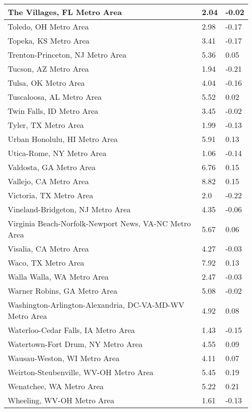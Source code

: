\documentclass[12pt,oneside, letterpaper]{book}
\begin{document}
\begin{longtable}{| p{} | p{} | p{} |}
    The Villages, FL Metro Area & 2.04 & -0.02 \\ \hline
    Toledo, OH Metro Area & 2.98 & -0.17 \\ \hline
    Topeka, KS Metro Area & 3.41 & -0.17 \\ \hline
    Trenton-Princeton, NJ Metro Area & 5.36 & 0.05 \\ \hline
    Tucson, AZ Metro Area & 1.94 & -0.21 \\ \hline
    Tulsa, OK Metro Area & 4.04 & -0.16 \\ \hline
    Tuscaloosa, AL Metro Area & 5.52 & 0.02 \\ \hline
    Twin Falls, ID Metro Area & 3.45 & -0.02 \\ \hline
    Tyler, TX Metro Area & 1.99 & -0.13 \\ \hline
    Urban Honolulu, HI Metro Area & 5.91 & 0.13 \\ \hline
    Utica-Rome, NY Metro Area & 1.06 & -0.14 \\ \hline
    Valdosta, GA Metro Area & 6.76 & 0.15 \\ \hline
    Vallejo, CA Metro Area & 8.82 & 0.15 \\ \hline
    Victoria, TX Metro Area & 2.0 & -0.22 \\ \hline
    Vineland-Bridgeton, NJ Metro Area & 4.35 & -0.06 \\ \hline
    Virginia Beach-Norfolk-Newport News, VA-NC Metro Area & 5.67 & 0.06 \\ \hline
    Visalia, CA Metro Area & 4.27 & -0.03 \\ \hline
    Waco, TX Metro Area & 7.92 & 0.13 \\ \hline
    Walla Walla, WA Metro Area & 2.47 & -0.03 \\ \hline
    Warner Robins, GA Metro Area & 5.08 & -0.02 \\ \hline
    Washington-Arlington-Alexandria, DC-VA-MD-WV Metro Area & 4.92 & 0.08 \\ \hline
    Waterloo-Cedar Falls, IA Metro Area & 1.43 & -0.15 \\ \hline
    Watertown-Fort Drum, NY Metro Area & 4.55 & 0.09 \\ \hline
    Wausau-Weston, WI Metro Area & 4.11 & 0.07 \\ \hline
    Weirton-Steubenville, WV-OH Metro Area & 5.45 & 0.19 \\ \hline
    Wenatchee, WA Metro Area & 5.22 & 0.21 \\ \hline
    Wheeling, WV-OH Metro Area & 1.61 & -0.13 \\ \hline

\end{longtable}
\end{document}
